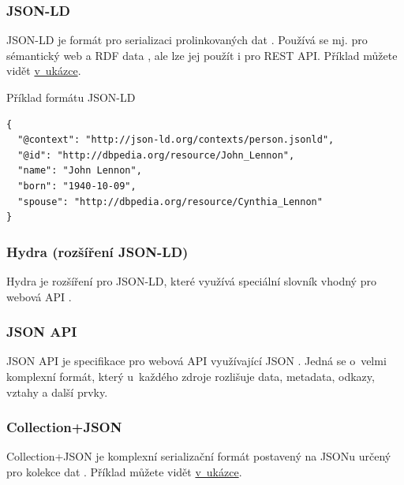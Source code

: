\subsubsection*{JSON-LD}\label{json-ld}

JSON-LD je formát pro serializaci prolinkovaných dat \autocite{jsonld}. Používá se mj. pro sémantický web a RDF data \autocite{jsonldrdf}, ale lze jej použít i pro REST API. Příklad můžete vidět \protect\hyperlink{code:jsonld}{v~ukázce}.

\begin{listing}[htbp]
\caption{{\label{code:jsonld}Příklad formátu JSON-LD \autocite{jsonld}}}
\begin{verbatim}
{
  "@context": "http://json-ld.org/contexts/person.jsonld",
  "@id": "http://dbpedia.org/resource/John_Lennon",
  "name": "John Lennon",
  "born": "1940-10-09",
  "spouse": "http://dbpedia.org/resource/Cynthia_Lennon"
}
\end{verbatim}
\end{listing}

\subsubsection*{Hydra (rozšíření JSON-LD)}\label{hydra-rozux161uxedux159enuxed-json-ld}

Hydra je rozšíření pro JSON-LD, které využívá speciální slovník vhodný pro webová API \autocite{hydra}.

\subsubsection*{JSON API}\label{json-api}

JSON API je specifikace pro webová API využívající JSON \autocite{jsonapi}. Jedná se o~velmi komplexní formát, který u~každého zdroje rozlišuje data, metadata, odkazy, vztahy a další prvky.

\subsubsection*{Collection+JSON}\label{collectionjson}

Collection+JSON je komplexní serializační formát postavený na JSONu určený pro kolekce dat \autocite{collectionjson}. Příklad můžete vidět \protect\hyperlink{code:collectionjson}{v~ukázce}.

